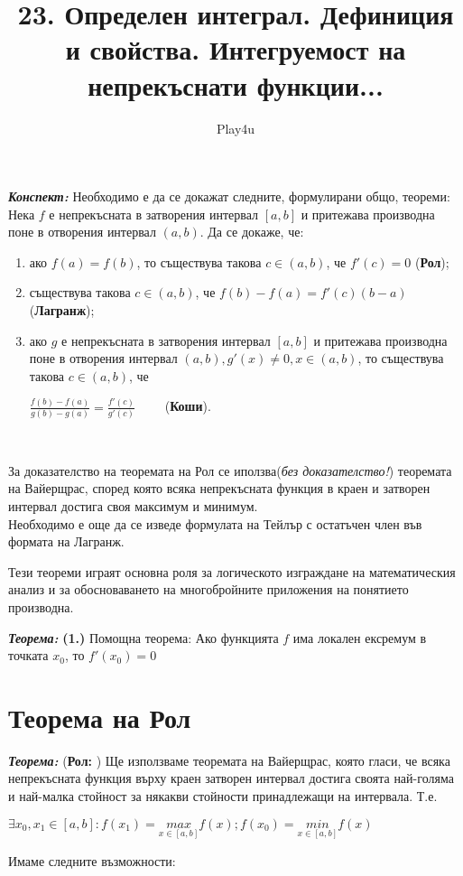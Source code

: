 \documentclass[11pt]{article} %
\title{23. Определен интеграл. Дефиниция и свойства. Интегруемост на непрекъснати функции...}
\author{Play4u}
\newcommand{\italicBold}[1]{\textbf{\emph{#1}}}
\newcommand{\theorem}{\italicBold{Теорема: }}
\newcommand{\enumlet}{\renewcommand{\theenumi}{\alph{enumi}}}
\begin{document}
\maketitle

\italicBold{Конспект: } Необходимо е да се докажат следните, формулирани общо, теореми: Нека $f$ е непрекъсната в затворения интервал $[a,b]$ и притежава производна поне в отворения интервал $(a,b)$. Да се докаже, че:

\enumlet
\begin{enumerate}
	\item ако $f(a)=f(b)$, то съществува такова $c \in (a,b)$, че $f'(c)=0$ (\textbf{Рол});\\
	\item съществува такова $c \in (a,b)$, че $f(b)-f(a)=f'(c)(b-a)$ (\textbf{Лагранж});\\
	\item ако $g$ е непрекъсната в затворения интервал $[a,b]$ и притежава производна поне в отворения интервал $(a,b), g'(x) \neq 0, x \in (a,b)$, то съществува такова $c \in (a,b)$, че \\
		\centerline{$\frac{f(b)-f(a)}{g(b)-g(a)}=\frac{f'(c)}{g'(c)} \qquad$ (\textbf{Коши}).}\\
\end{enumerate}
За доказателство на теоремата на Рол се иползва(\textit{без доказателство!}) теоремата на Вайерщрас, според която всяка непрекъсната функция в краен и затворен интервал достига своя максимум и минимум.\\
Необходимо е още да се изведе формулата на Тейлър с остатъчен член във формата на Лагранж.\\\par

Тези теореми играят основна роля за логическото изграждане на математическия анализ и за обосноваването на многобройните приложения на понятието производна.

\theorem \textbf{(1.)} Помощна теорема: Ако функцията $f$ има локален ексремум в точката $x_{0}$, то $f'(x_{0}) = 0$

\section{Теорема на Рол}
\theorem (\textbf{Рол: }) Ще използваме теоремата на Вайерщрас, която гласи, че всяка непрекъсната функция върху краен затворен интервал достига своята най-голяма и най-малка стойност за някакви стойности принадлежащи на интервала. Т.е.\\
\centerline{$\exists x_{0}, x_{1} \in [a,b]:f(x_{1})=\underset{x \in [a,b]}{max} f(x); f(x_{0}) = \underset{x \in [a,b]}{min} f(x)$}
 Имаме следните възможности:\\
\end{document}
